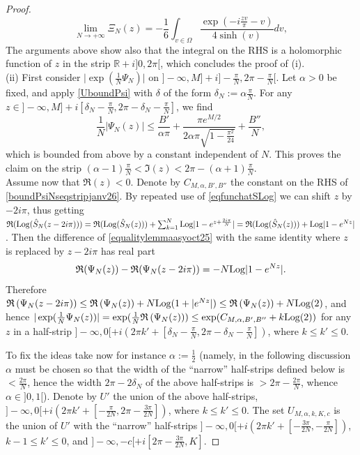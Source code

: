 \documentclass[11pt]{amsart}
\newcommand{\mr}{\mathbb{R}}
\newcommand{\Log}{{\rm Log}}
\begin{document}
{\begin{proof}
$$\lim_{N\rightarrow +\infty}  \Xi_N(z) = -\frac{1}{6} \int_{v\in \Omega} \dfrac{\exp(-i\frac{z v}{\pi}-v)}{4 \sinh(v)}dv,$$
The arguments above show also that the integral on the RHS is a holomorphic function of $z$ in the strip $\mr+i]0, 2\pi[$, which concludes the proof of (i).\\ 
(ii) First consider $\textstyle \vert \exp(\frac{1}{N} \Psi_N)\vert$ on $\textstyle ]-\infty,M] +i]-\frac{\pi}{N}, 2\pi-\frac{\pi}{N}[$. Let $\alpha>0$ be fixed, and apply \eqref{UboundPsi} with $\delta$ of the form $\delta_N:=\textstyle \alpha\frac{\pi}{N}$. For any $z\in \textstyle ]-\infty,M] +i[\delta_N-\frac{\pi}{N}, 2\pi-\delta_N-\frac{\pi}{N}]$, we find 
\begin{equation}\label{boundPsiNseqstripjanv26}
\frac{1}{N}\vert \Psi_N(z)\vert\leq \frac{B'}{\alpha\pi} +\dfrac{\pi e^{M/2}}{2\alpha\pi\sqrt{1- \frac{\pi^2}{24}}}+\frac{B''}{N},
\end{equation}
which is bounded from above by a constant independent of $N$. This proves the claim on the strip $\textstyle (\alpha-1)\frac{\pi}{N}< \mathfrak{I}(z)< 2\pi-(\alpha+1)\frac{\pi}{N}$.\\
Assume now that $\mathfrak{R}(z)<0$. Denote by $C_{M,\alpha,B',B''}$ the constant on the RHS of \eqref{boundPsiNseqstripjanv26}. By repeated use of \eqref{eqfunchatSLog} we can shift $z$ by $-2i\pi$, thus getting $\textstyle \mathfrak{R}(\Log (\hat S_{N}(z-2i\pi))) = \mathfrak{R}(\Log (\hat S_{N}(z))) + \sum_{k=1}^N \Log\vert 1-e^{z+\frac{2i\pi}{N}}\vert = \mathfrak{R}(\Log (\hat S_{N}(z))) + \Log\vert 1-e^{Nz}\vert$. Then the difference of \eqref{equalitylemmaasyoct25} with the same identity where $z$ is replaced by $z-2i\pi$ has real part 
\begin{equation}\label{shiftby2pi}
\mathfrak{R}(\Psi_N(z)) - \mathfrak{R}(\Psi_N(z-2i\pi)) = -N\Log\vert 1-e^{Nz}\vert.
\end{equation}
Therefore $\mathfrak{R}\left(\Psi_N(z-2i\pi)\right) \leq \mathfrak{R}\left(\Psi_N(z)\right)+N\Log(1+\vert e^{Nz}\vert)\leq \mathfrak{R}\left(\Psi_N(z)\right)+N\Log(2)$, and hence $\textstyle \vert \exp(\frac{1}{N} \Psi_N(z))\vert = \exp(\frac{1}{N} \mathfrak{R}\left(\Psi_N(z)\right))\leq \exp(C_{M,\alpha,B',B''}+k\Log(2))$ for any $z$ in a  half-strip $\textstyle ]-\infty,0[ +i(2\pi k'+[\delta_N-\frac{\pi}{N}, 2\pi-\delta_N-\frac{\pi}{N}])$, where $k\leq k'\leq 0$.

To fix the ideas take now for instance $\textstyle \alpha:= \frac{1}{2}$ (namely, in the following discussion $\alpha$ must be chosen so that the width of the ``narrow'' half-strips defined below is $\textstyle <\frac{2\pi}{N}$, hence the width $2\pi - 2\delta_N$ of the above half-strips is $> \textstyle 2\pi - \frac{2\pi}{N}$, whence $\alpha\in ]0,1[$). Denote by $U'$ the union of the above half-strips, $\textstyle ]-\infty,0[ +i(2\pi k'+[-\frac{\pi}{2N}, 2\pi-\frac{3\pi}{2N}])$, where $k\leq k'\leq 0$. The set $U_{M,\alpha,k,K,c}$ is the union of $U'$ with the ``narrow'' half-strips $\textstyle ]-\infty,0[ +i\left( 2\pi k'+ [-\frac{3\pi}{2N},-\frac{\pi}{2N}]\right)$, $k-1\leq k'\leq 0$, and $\textstyle ]-\infty,-c[ +i[2\pi-\frac{3\pi}{2N}, K]$.


\end{proof}}
\end{document}
